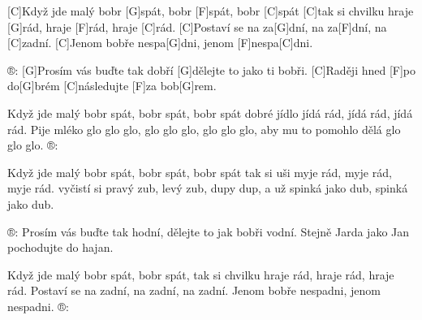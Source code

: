 
[C]Když jde malý bobr [G]spát, bobr [F]spát, bobr [C]spát
[C]tak si chvilku hraje [G]rád, hraje [F]rád, hraje [C]rád.
[C]Postaví se na za[G]dní, na za[F]dní, na [C]zadní.
[C]Jenom bobře nespa[G]dni, jenom [F]nespa[C]dni.

®: [G]Prosím vás buďte tak dobří 
[G]dělejte to jako ti bobři.
[C]Raději hned [F]po do[G]brém 
[C]následujte [F]za bob[G]rem.

Když jde malý bobr spát, bobr spát, bobr spát
dobré jídlo jídá rád, jídá rád, jídá rád.
Pije mléko glo glo glo, glo glo glo, glo glo glo,
aby mu to pomohlo dělá glo glo glo. ®:

Když jde malý bobr spát, bobr spát, bobr spát
tak si uši myje rád, myje rád, myje rád.
vyčistí si pravý zub, levý zub, dupy dup,
a už spinká jako dub, spinká jako dub.

®: Prosím vás buďte tak hodní, 
dělejte to jak bobři vodní.
Stejně Jarda jako Jan 
pochodujte do hajan.

Když jde malý bobr spát, bobr spát,
tak si chvilku hraje rád, hraje rád, hraje rád.
Postaví se na zadní, na zadní, na zadní.
Jenom bobře nespadni, jenom nespadni. ®:

